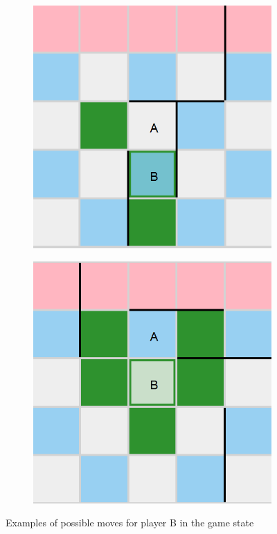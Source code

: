 \begin{figure}[!ht]
\begin{subfigure}{0.2\textwidth}
    \end{subfigure}
    \hfill
    \begin{subfigure}{0.2\textwidth}
        \includegraphics[width=\textwidth]{../img/GameBoard/move03.png}
    \end{subfigure}
    \hfill
    \begin{subfigure}{0.2\textwidth}
        \includegraphics[width=\textwidth]{../img/GameBoard/move04.png}
    \end{subfigure}
    \caption{Examples of possible moves for player B in the game state}
    \label{fig:PossibleMoves}
\end{figure}